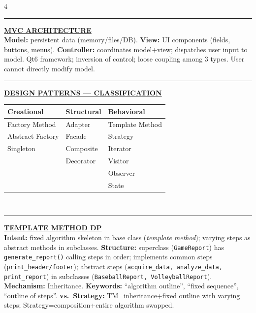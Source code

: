 \documentclass[landscape,letterpaper]{article}
\newcommand{\h}[1]{\textbf{#1}}
\newcommand{\hd}[1]{\vspace{1pt}\noindent\textbf{\underline{#1}}\vspace{-1pt}}
\begin{document}
\begin{multicols}{4}
\vspace{-1pt}\noindent\rule{\columnwidth}{0.2pt}\vspace{-3pt}

\hd{MVC ARCHITECTURE}\\[-2pt]
\h{Model:} persistent data (memory/files/DB). \h{View:} UI components (fields, buttons, menus). \h{Controller:} coordinates model+view; dispatches user input to model. Qt6 framework; inversion of control; loose coupling among 3 types. User cannot directly modify model.\\[-2pt]

\vspace{-1pt}\noindent\rule{\columnwidth}{0.2pt}\vspace{-3pt}

\hd{DESIGN PATTERNS — CLASSIFICATION}\\[-2pt]
\vspace{-3pt}
{\fontsize{5.8}{6.6}\selectfont
\begin{tabular}{@{}lll@{}}
\toprule
\textbf{Creational} & \textbf{Structural} & \textbf{Behavioral}\\
\midrule
Factory Method & Adapter & Template Method\\
Abstract Factory & Facade & Strategy\\
Singleton & Composite & Iterator\\
 & Decorator & Visitor\\
 &  & Observer\\
 &  & State\\
\bottomrule
\end{tabular}
}\\[-2pt]

\vspace{-1pt}\noindent\rule{\columnwidth}{0.2pt}\vspace{-3pt}

\hd{TEMPLATE METHOD DP}\\[-2pt]
\h{Intent:} fixed algorithm skeleton in base class (\emph{template method}); varying steps as abstract methods in subclasses. \h{Structure:} superclass (\texttt{GameReport}) has \texttt{generate\_report()} calling steps in order; implements common steps (\texttt{print\_header/footer}); abstract steps (\texttt{acquire\_data, analyze\_data, print\_report}) in subclasses (\texttt{BaseballReport, VolleyballReport}). \h{Mechanism:} Inheritance. \h{Keywords:} ``algorithm outline'', ``fixed sequence'', ``outline of steps''. \h{vs.\ Strategy:} TM=inheritance+fixed outline with varying steps; Strategy=composition+entire algorithm swapped.\\[-2pt]


\end{multicols}
\end{document}
